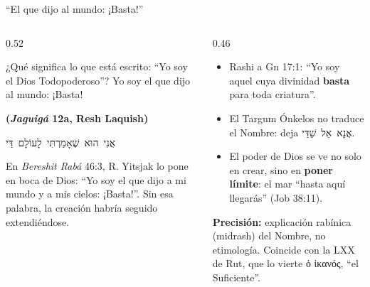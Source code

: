 \documentclass[hyperref={bookmarks=false},aspectratio=169]{beamer}
\newcommand{\heb}[1]{\mbox{\foreignlanguage{hebrew}{#1}}}
\newcommand{\grc}[1]{\foreignlanguage{ancientgreek}{#1}}
\newcommand{\fuente}[1]{\par\hfill{\upshape\bfseries\footnotesize\textcolor{azul}{#1}}}
\newcommand{\destacar}[1]{\textbf{\textcolor{azul}{#1}}}
\newcommand{\precision}[1]{{\footnotesize\color{gris}\textbf{Precisión:} #1}}
\begin{document}
\begin{frame}{``El que dijo al mundo: ¡Basta!''}
\begin{columns}[t,onlytextwidth]
\begin{column}{0.52\textwidth}
\begin{cita}[colback=dorado!10!papiro,colframe=dorado!80!azul]¿Qué significa lo que está escrito: ``Yo soy el Dios Todopoderoso''? Yo soy el que dijo al mundo: ¡Basta!\fuente{(\emph{Jaguigá} 12a, Resh Laquish)}\end{cita}
\begin{center}\scriptsize\heb{אֲנִי הוּא שֶׁאָמַרְתִּי לָעוֹלָם דַּי}\end{center}
\scriptsize En \emph{Bereshit Rabá} 46:3, R. Yitsjak lo pone en boca de Dios: ``Yo soy el que dijo a mi mundo y a mis cielos: ¡Basta!''. Sin esa palabra, la creación habría seguido extendiéndose.
\end{column}
\begin{column}{0.46\textwidth}\small
\begin{itemize}
\item Rashi a Gn 17:1: ``Yo soy aquel cuya divinidad \destacar{basta} para toda criatura''.
\item El Targum Ónkelos no traduce el Nombre: deja \heb{אֲנָא אֵל שַׁדַּי}.
\item El poder de Dios se ve no solo en crear, sino en \destacar{poner límite}: el mar ``hasta aquí llegarás'' (Job 38:11).
\end{itemize}
\precision{explicación rabínica (midrash) del Nombre, no etimología. Coincide con la LXX de Rut, que lo vierte \grc{ὁ ἱκανός}, ``el Suficiente''.}
\end{column}
\end{columns}
\end{frame}
\end{document}

